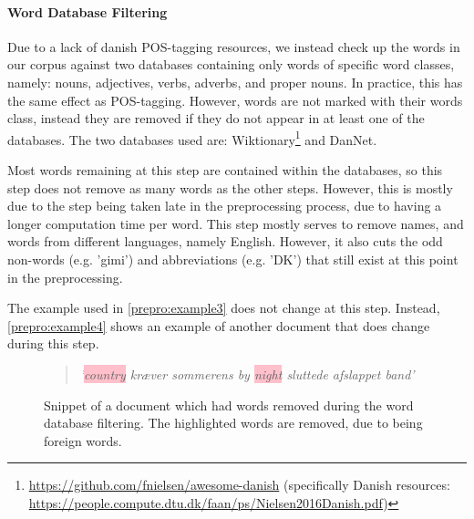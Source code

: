 \paragraph{Word Database Filtering}
Due to a lack of danish POS-tagging resources, we instead check up the words in our corpus against two databases containing only words of specific word classes, namely: nouns, adjectives, verbs, adverbs, and proper nouns.
In practice, this has the same effect as POS-tagging.
However, words are not marked with their words class, instead they are removed if they do not appear in at least one of the databases.
The two databases used are:  Wiktionary\footnote{\url{https://github.com/fnielsen/awesome-danish} (specifically Danish resources: \url{https://people.compute.dtu.dk/faan/ps/Nielsen2016Danish.pdf})} and DanNet\cite{Pedersen2009DanNetTC}. 

Most words remaining at this step are contained within the databases, so this step does not remove as many words as the other steps.
However, this is mostly due to the step being taken late in the preprocessing process, due to having a longer computation time per word.
This step mostly serves to remove names, and words from different languages, namely English.
However, it also cuts the odd non-words (e.g. 'gimi') and abbreviations (e.g. 'DK') that still exist at this point in the preprocessing.

The example used in \autoref{prepro:example3} does not change at this step. 
Instead, \autoref{prepro:example4} shows an example of another document that does change during this step.

\begin{figure}[h]
	\begin{framed}
		\begin{quote}
			\textit{
				'\colorbox{pink}{country} kræver sommerens by \colorbox{pink}{night} sluttede afslappet band'
			}
		\end{quote}
	\end{framed}
	\caption{Snippet of a document which had words removed during the word database filtering. The highlighted words are removed, due to being foreign words.}
	\label{prepro:example4}
\end{figure}

